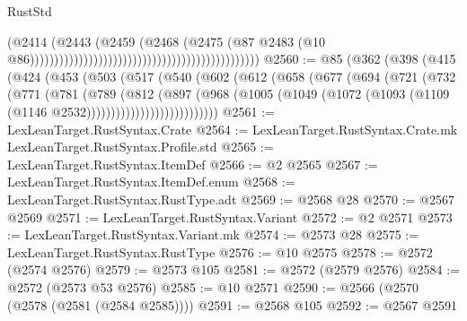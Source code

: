 \begin{lexlean}{RustStd}
\begin{coremodule}
                                                                                    (@2414
                                                                                      (@2443
                                                                                        (@2459
                                                                                          (@2468
                                                                                            (@2475
                                                                                              (@87
                                                                                                @2483
                                                                                                (@10
                                                                                                  @86)))))))))))))))))))))))))))))))))))))))))))))))
@2560 := @85
    (@362
      (@398
        (@415
          (@424
            (@453
              (@503
                (@517
                  (@540
                    (@602
                      (@612
                        (@658
                          (@677
                            (@694
                              (@721
                                (@732
                                  (@771
                                    (@781
                                      (@789
                                        (@812
                                          (@897
                                            (@968
                                              (@1005
                                                (@1049
                                                  (@1072
                                                    (@1093
                                                      (@1109 (@1146 @2532)))))))))))))))))))))))))))
@2561 := LexLeanTarget.RustSyntax.Crate
@2564 := LexLeanTarget.RustSyntax.Crate.mk LexLeanTarget.RustSyntax.Profile.std
@2565 := LexLeanTarget.RustSyntax.ItemDef
@2566 := @2 @2565
@2567 := LexLeanTarget.RustSyntax.ItemDef.enum
@2568 := LexLeanTarget.RustSyntax.RustType.adt
@2569 := @2568 @28
@2570 := @2567 @2569
@2571 := LexLeanTarget.RustSyntax.Variant
@2572 := @2 @2571
@2573 := LexLeanTarget.RustSyntax.Variant.mk
@2574 := @2573 @28
@2575 := LexLeanTarget.RustSyntax.RustType
@2576 := @10 @2575
@2578 := @2572 (@2574 @2576)
@2579 := @2573 @105
@2581 := @2572 (@2579 @2576)
@2584 := @2572 (@2573 @53 @2576)
@2585 := @10 @2571
@2590 := @2566 (@2570 (@2578 (@2581 (@2584 @2585))))
@2591 := @2568 @105
@2592 := @2567 @2591

\end{coremodule}
\end{lexlean}
